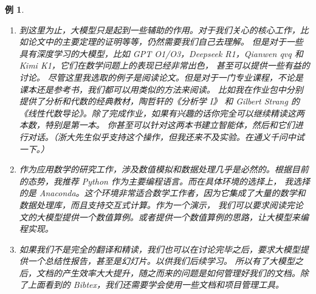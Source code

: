 \documentclass{ctexbook}
\newtheorem{example}[theorem]{例}
\numberwithin{theorem}{chapter}
\begin{document}
\begin{example}
\begin{enumerate}
    最后再以 latex 格式输出。这样你就能得到一个非常好的格式化翻译文本，以便精读。我们需要逐句检查翻译的准确性，和推理的正确性，
    在这个过程中，我们会像手抄一样仔细检查每一个符号，从而获得接近手抄的理解效果。当然这一点有一定的个人因素。
    \item 到这里为止，大模型只是起到一些辅助的作用。对于我们关心的核心工作，比如论文中的主要定理的证明等等，仍然需要我们自己去理解。
    但是对于一些具有深度学习的大模型，比如 GPT O1/O3，Deepseek R1，Qianwen qvq 和 Kimi K1，它们在数学问题上的表现已经非常出色，
    甚至可以提供一些有益的讨论。 尽管这里我选取的例子是阅读论文。但是对于一门专业课程，不论是课本还是参考书，我们都可以用类似的方法来阅读。
    比如我在作业包中分别提供了分析和代数的经典教材，陶哲轩的《分析学 I》\cite{Tao2016AnalysisI} 
    和 Gilbert Strang 的《线性代数导论》\cite{Strang2016LinearAlgebra}。除了完成作业，如果有兴趣的话你完全可以继续精读这两本数，特别是第一本。
    你甚至可以针对这两本书建立智能体，然后和它们进行对话。（浙大先生似乎支持这个操作，但我还来不及实验。在通义千问中试一下。）
    \item 作为应用数学的研究工作，涉及数值模拟和数据处理几乎是必然的。根据目前的态势，我推荐 Python 作为主要编程语言。而在具体环境的选择上，
    我选择的是 Anaconda。这个环境非常适合数学工作者，因为它集成了大量的数学和数据处理库，而且支持交互式计算。作为一个演示，
    我们可以要求阅读完论文的大模型提供一个数值算例。或者提供一个数值算例的思路，让大模型来编程实现。
    \item 如果我们不是完全的翻译和精读，我们也可以在讨论完毕之后，要求大模型提供一个总结性报告，甚至是幻灯片。以供我们后续学习。
    所以有了大模型之后，文档的产生效率大大提升，随之而来的问题是如何管理好我们的文档。除了上面看到的 Bibtex，我们还需要学会使用一些文档和项目管理工具。
    
  \end{enumerate}
\end{example}

\end{document}
